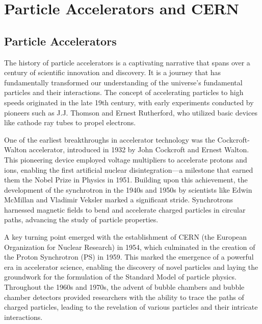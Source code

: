 \section{Particle Accelerators and CERN}

\subsection{Particle Accelerators}



The history of particle accelerators is a captivating narrative that spans over a century of scientific innovation and discovery. It is a journey that has fundamentally transformed our understanding of the universe's fundamental particles and their interactions. The concept of accelerating particles to high speeds originated in the late 19th century, with early experiments conducted by pioneers such as J.J. Thomson and Ernest Rutherford, who utilized basic devices like cathode ray tubes to propel electrons.

One of the earliest breakthroughs in accelerator technology was the Cockcroft-Walton accelerator, introduced in 1932 by John Cockcroft and Ernest Walton. This pioneering device employed voltage multipliers to accelerate protons and ions, enabling the first artificial nuclear disintegration—a milestone that earned them the Nobel Prize in Physics in 1951. Building upon this achievement, the development of the synchrotron in the 1940s and 1950s by scientists like Edwin McMillan and Vladimir Veksler marked a significant stride. Synchrotrons harnessed magnetic fields to bend and accelerate charged particles in circular paths, advancing the study of particle properties.

A key turning point emerged with the establishment of CERN (the European Organization for Nuclear Research) in 1954, which culminated in the creation of the Proton Synchrotron (PS) in 1959. This marked the emergence of a powerful era in accelerator science, enabling the discovery of novel particles and laying the groundwork for the formulation of the Standard Model of particle physics. Throughout the 1960s and 1970s, the advent of bubble chambers and bubble chamber detectors provided researchers with the ability to trace the paths of charged particles, leading to the revelation of various particles and their intricate interactions.

